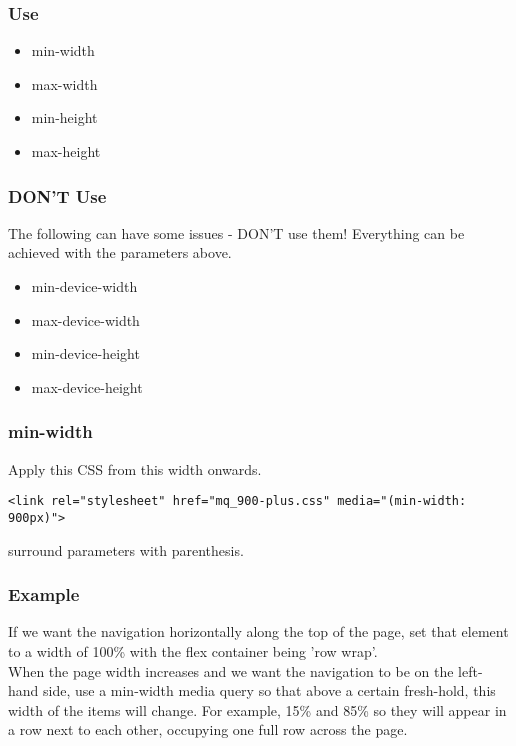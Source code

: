 \documentclass[]{article}
\newcommand{\<}{\guilsinglleft}
\renewcommand{\>}{\guilsinglright}
\begin{document}
\subsubsection{Use}
\begin{itemize}
	\item min-width
	\item max-width
	\item min-height
	\item max-height
\end{itemize}

\subsubsection{DON'T Use}
The following can have some issues - DON'T use them!  Everything can be achieved with the parameters above.
\begin{itemize}
	\item min-device-width
	\item max-device-width
	\item min-device-height
	\item max-device-height
\end{itemize}

\subsubsection{min-width}
Apply this CSS from this width onwards.
\begin{lstlisting}
<link rel="stylesheet" href="mq_900-plus.css" media="(min-width: 900px)">
\end{lstlisting}
surround parameters with parenthesis. 

\subsubsection{Example}
If we want the navigation horizontally along the top of the page, set that element to a width of 100\% with the flex container being 'row wrap'.  
\\
When the page width increases and we want the navigation to be on the left-hand side, use a min-width media query so that above a certain fresh-hold, this width of the items will change.  For example, 15\% and 85\% so they will appear in a row next to each other, occupying one full row across the page.
\end{document}
